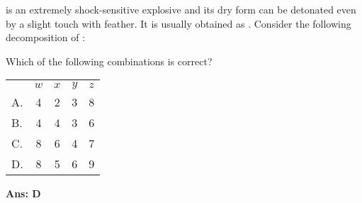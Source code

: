 \documentclass[border=3pt,varwidth=70mm]{standalone}
\begin{document}
 is an extremely shock-sensitive explosive and its dry form can be detonated even by a slight touch with feather. It is usually obtained as . Consider the following decomposition of :

\begin{center}
\end{center}

Which of the following combinations is correct?

\begin{center}
\begin{tabular}{lcccc}
   & $w$ & $x$& $y$ & $z$ \\[1em]
A.\qquad & 4 & 2 & 3 & 8 \\[1em]
B.\qquad & 4 & 4 & 3 & 6 \\[1em]
C.\qquad & 8 & 6 & 4 & 7 \\[1em]
D.\qquad & 8 & 5 & 6 & 9\\[1em]
\end{tabular}
\end{center}

\begin{answer}
\hrulefill\par
\textbf{Ans: D}

\end{answer}
\end{document}
